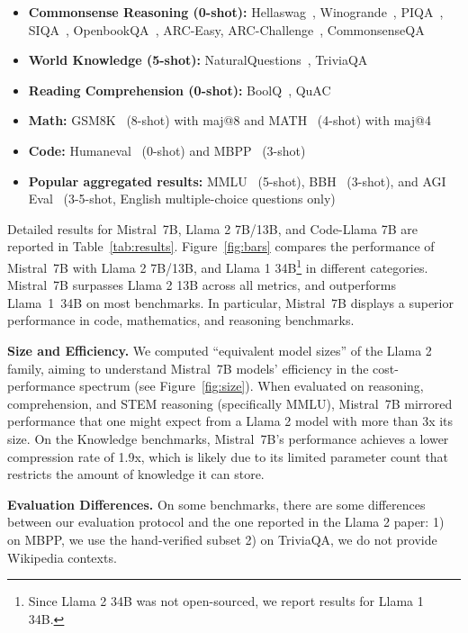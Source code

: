 \documentclass{article}
\def\llama{Llama\xspace}
\def\mistral{Mistral~7B\xspace}
\begin{document}
\begin{itemize}[leftmargin=10pt]
\item \textbf{Commonsense Reasoning (0-shot):} Hellaswag~\cite{zellers2019hellaswag}, Winogrande~\cite{sakaguchi2021winogrande}, PIQA~\cite{bisk2020piqa}, SIQA~\cite{sap2019socialiqa}, OpenbookQA~\cite{mihaylov2018can}, ARC-Easy, ARC-Challenge~\cite{clark2018think}, CommonsenseQA~\cite{talmor2018commonsenseqa}
\item \textbf{World Knowledge (5-shot):} NaturalQuestions~\cite{kwiatkowski2019natural}, TriviaQA~\cite{joshi2017triviaqa}
\item \textbf{Reading Comprehension (0-shot):} BoolQ~\cite{clark2019boolq}, QuAC~\cite{choi2018quac}
\item \textbf{Math:} GSM8K~\cite{cobbe2021training} (8-shot) with maj@8 and MATH~\cite{hendrycks2021measuring} (4-shot) with maj@4
\item \textbf{Code:} Humaneval~\cite{chen2021evaluating} (0-shot) and MBPP~\cite{austin2021program} (3-shot)
\item \textbf{Popular aggregated results:} MMLU~\cite{hendrycks2020measuring} (5-shot), BBH~\cite{suzgun2022challenging} (3-shot), and AGI Eval~\cite{zhong2023agieval} (3-5-shot, English multiple-choice questions only)
\end{itemize}

Detailed results for \mistral, \llama 2 7B/13B, and Code-\llama 7B are reported in Table~\ref{tab:results}.
Figure~\ref{fig:bars} compares the performance of \mistral with \llama 2 7B/13B, and \llama 1 34B\footnote{Since \llama 2 34B was not open-sourced, we report results for \llama 1 34B.} in different categories.
\mistral surpasses \llama 2 13B across all metrics, and outperforms \llama~1~34B on most benchmarks.
In particular, \mistral displays a superior performance in code, mathematics, and reasoning benchmarks.

\textbf{Size and Efficiency.} We computed ``equivalent model sizes'' of the \llama 2 family, aiming to understand \mistral models' efficiency in the cost-performance spectrum (see Figure~\ref{fig:size}). When evaluated on reasoning, comprehension, and STEM reasoning (specifically MMLU), \mistral mirrored performance that one might expect from a \llama 2 model with more than 3x its size. On the Knowledge benchmarks, \mistral's performance achieves a lower compression rate of 1.9x, which is likely due to its limited parameter count that restricts the amount of knowledge it can store.

\textbf{Evaluation Differences.} On some benchmarks, there are some differences between our evaluation protocol and the one reported in the \llama 2 paper: 1) on MBPP, we use the hand-verified subset 2) on TriviaQA, we do not provide Wikipedia contexts.
\end{document}
